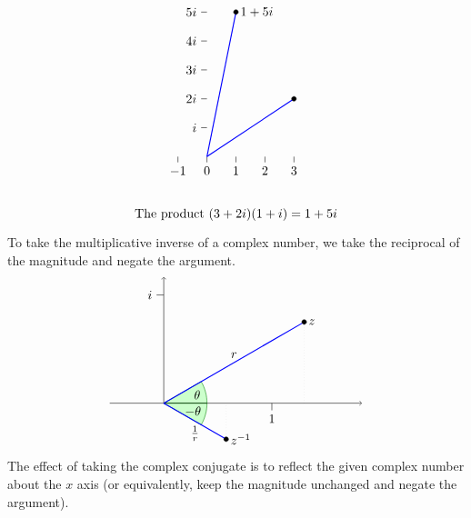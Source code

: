 \begin{equation*}
\begin{tikzpicture}[scale=0.8]
\begin{scope}[xshift=14cm]
      \draw(0,1) -- +(-0.2,0) node[left] {$i$};
      \draw(0,2) -- +(-0.2,0) node[left] {$2i$};
      \draw(0,3) -- +(-0.2,0) node[left] {$3i$};
      \draw(0,4) -- +(-0.2,0) node[left] {$4i$};
      \draw(0,5) -- +(-0.2,0) node[left] {$5i$};
      \draw(-1,0) -- +(0,-0.2) node[below] {$-1$};
      \draw(0,0) -- +(0,-0.2) node[below] {$0$};
      \draw(1,0) -- +(0,-0.2) node[below] {$1$};
      \draw(2,0) -- +(0,-0.2) node[below] {$2$};
      \draw(3,0) -- +(0,-0.2) node[below] {$3$};
      \draw[thick, blue] (0,0) -- (3,2);
      \draw[fill, black] (3,2) circle [radius=2.25pt];
      \draw[thick, blue] (0,0) -- (1,5);
      \draw[fill, black] (1,5) circle [radius=2.25pt] node [right] {$1+5i$};
      \draw (1,-2) node {The product $(3+2i)(1+i)=1+5i$};
    \end{scope}
  \end{tikzpicture}
\end{equation*}
To take the multiplicative inverse of a complex number, we take the
reciprocal of the magnitude and negate the argument.
\begin{equation*}
  \begin{tikzpicture}
    \draw[help lines, dotted] (30:4.5) -- (30:4.5 |- 0,0);
    \draw[help lines, dotted] (-30:2) -- (-30:2 |- 0,0);
    \filldraw[fill=green!20,draw=green!50!black] (0,0) -- (1.2,0) arc (0:30:1.2) -- cycle;
    \filldraw[fill=green!20,draw=green!50!black] (0,0) -- (1.2,0) arc (0:-30:1.2) -- cycle;
    \node at (15:9mm){$~\theta$};
    \node at (-15:9mm){$-\theta~$};
    \draw[->](-1.5,0) -- (5.5,0);
    \draw[->](0,0) -- (0,3.5);
    \draw(0,3) -- +(-0.2,0) node[left] {$i$};
    \draw(3,0) -- +(0,-0.2) node[below] {$1$};
    \draw[thick, blue] (0,0) -- node[above, black] {$r$} (30:4.5);
    \draw[fill, black] (30:4.5) circle [radius=1.8pt] node [right] {$z$};
    \draw[thick, blue] (0,0) -- node[below, black] {$\frac{1}{r}$} (-30:2);
    \draw[fill, black] (-30:2) circle [radius=1.8pt] node [right] {$z^{-1}$};
  \end{tikzpicture}
\end{equation*}
The effect of taking the complex conjugate is to reflect the given
complex number about the $x$ axis (or equivalently, keep the magnitude
unchanged and negate the argument).
